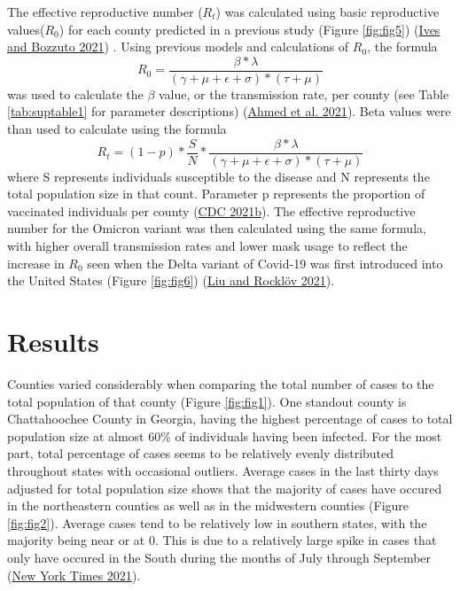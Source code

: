 \documentclass[
  12pt,
]{article}
\begin{document}
The effective reproductive number (\(R_t\)) was calculated using basic reproductive values(\(R_0\)) for each county predicted in a previous study (Figure \ref{fig:fig5}) (\protect\hyperlink{ref-ives_estimating_2021}{Ives and Bozzuto 2021}) . Using previous models and calculations of \(R_0\), the formula
\[R_0 = \frac{\beta*\lambda}{(\gamma+\mu+\epsilon+\sigma)*(\tau+\mu)}\]
was used to calculate the \(\beta\) value, or the transmission rate, per county (see Table \ref{tab:suptable1} for parameter descriptions) (\protect\hyperlink{ref-ahmed_mathematical_2021}{Ahmed et al. 2021}). Beta values were than used to calculate using the formula
\[R_t = (1-p)*\frac{S}{N}*\frac{\beta*\lambda}{(\gamma+\mu+\epsilon+\sigma)*(\tau+\mu)}\]
where S represents individuals susceptible to the disease and N represents the total population size in that count. Parameter p represents the proportion of vaccinated individuals per county (\protect\hyperlink{ref-cdc_covid-19_2021}{CDC 2021b}). The effective reproductive number for the Omicron variant was then calculated using the same formula, with higher overall transmission rates and lower mask usage to reflect the increase in \(R_0\) seen when the Delta variant of Covid-19 was first introduced into the United States (Figure \ref{fig:fig6}) (\protect\hyperlink{ref-liu_reproductive_2021}{Liu and Rocklöv 2021}).

\hypertarget{results}{%
\section{Results}\label{results}}

Counties varied considerably when comparing the total number of cases to the total population of that county (Figure \ref{fig:fig1}). One standout county is Chattahoochee County in Georgia, having the highest percentage of cases to total population size at almost 60\% of individuals having been infected. For the most part, total percentage of cases seems to be relatively evenly distributed throughout states with occasional outliers. Average cases in the last thirty days adjusted for total population size shows that the majority of cases have occured in the northeastern counties as well as in the midwestern counties (Figure \ref{fig:fig2}). Average cases tend to be relatively low in southern states, with the majority being near or at 0. This is due to a relatively large spike in cases that only have occured in the South during the months of July through September (\protect\hyperlink{ref-new_york_times_coronavirus_2021}{New York Times 2021}).
\end{document}
